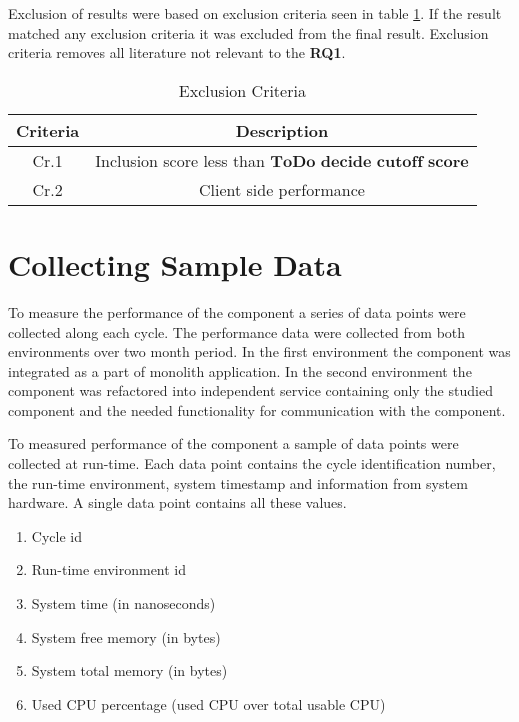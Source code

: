 Exclusion of results were based on exclusion criteria seen in table \ref{table:literature:exclusionCriteria}.
If the result matched any exclusion criteria it was excluded from the final result.
Exclusion criteria removes all literature not relevant to the \textbf{RQ1}.

\begin{table}[h!]
    \begin{tabular}{|c c|} 
        \hline
        Criteria & Description \\ [0.5ex] 
        \hline
        Cr.1 & Inclusion score less than $\textbf{ToDo decide cutoff score}$ \\
        \hline
        Cr.2 & Client side performance  \\
        \hline
    \end{tabular}    
    \caption{Exclusion Criteria}
    \label{table:literature:exclusionCriteria}
\end{table}



\section{Collecting Sample Data}
To measure the performance of the component a series of data points were collected along each cycle.
The performance data were collected from both environments over two month period.
In the first environment the component was integrated as a part of monolith application.
In the second environment the component was refactored into independent service containing only the studied component and the needed functionality for communication with the component.

To measured performance of the component a sample of data points were collected at run-time.
Each data point contains the cycle identification number, the run-time environment, system timestamp and information from system hardware.
A single data point contains all these values.
\begin{enumerate}
    \item Cycle id
    \item Run-time environment id
    \item System time (in nanoseconds)
    \item System free memory (in bytes)
    \item System total memory (in bytes)
    \item Used CPU percentage (used CPU over total usable CPU)
\end{enumerate}

